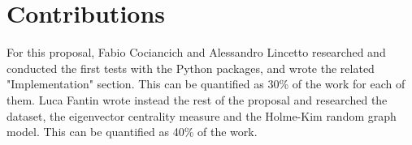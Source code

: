 \documentclass[a4paper, 12pt, conference]{ieeeconf}      %
\begin{document}



\section*{Contributions}

For this proposal, Fabio Cociancich and Alessandro Lincetto researched and conducted the first tests with the Python packages, and wrote the related "Implementation" section. This can be quantified as 30\% of the work for each of them. Luca Fantin wrote instead the rest of the proposal and researched the dataset, the eigenvector centrality measure and the Holme-Kim random graph model. This can be quantified as 40\% of the work.





\printbibliography[nottype=online]
\end{document}
